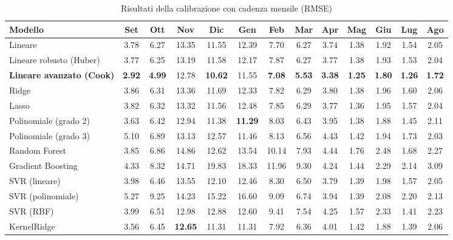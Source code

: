 \begin{table}[H]
    \tiny
    \centering
    \setlength{\tabcolsep}{4pt}
    \def\arraystretch{1.5}
    \begin{tabular}{|l|c|c|c|c|c|c|c|c|c|c|c|c|}
    \hline
        \textbf{Modello} & \textbf{Set} & \textbf{Ott} & \textbf{Nov} & \textbf{Dic} & \textbf{Gen} & \textbf{Feb} & \textbf{Mar} & \textbf{Apr} & \textbf{Mag} & \textbf{Giu} & \textbf{Lug} & \textbf{Ago} \\ \hline
        Lineare & 3.78 & 6.27 & 13.35 & 11.55 & 12.39 & 7.70 & 6.27 & 3.74 & 1.38 & 1.92 & 1.54 & 2.05 \\ \hline
        Lineare robusto (Huber) & 3.77 & 6.25 & 13.19 & 11.58 & 12.17 & 7.87 & 6.27 & 3.77 & 1.38 & 1.93 & 1.53 & 2.04 \\ \hline
        \textbf{Lineare avanzato (Cook)} & \textbf{2.92} & \textbf{4.99} & 12.78 & \textbf{10.62} & 11.55 & \textbf{7.08} & \textbf{5.53} & \textbf{3.38} & \textbf{1.25} & \textbf{1.80} & \textbf{1.26} & \textbf{1.72} \\ \hline
        Ridge & 3.86 & 6.31 & 13.36 & 11.69 & 12.33 & 7.82 & 6.29 & 3.80 & 1.38 & 1.96 & 1.60 & 2.06 \\ \hline
        Lasso & 3.82 & 6.32 & 13.32 & 11.56 & 12.48 & 7.85 & 6.29 & 3.77 & 1.36 & 1.95 & 1.57 & 2.04 \\ \hline
        Polinomiale (grado 2) & 3.63 & 6.42 & 12.94 & 11.38 & \textbf{11.29} & 8.03 & 6.43 & 3.95 & 1.38 & 1.88 & 1.45 & 2.11 \\ \hline
        Polinomiale (grado 3) & 5.10 & 6.89 & 13.13 & 12.57 & 11.46 & 8.13 & 6.56 & 4.43 & 1.42 & 1.94 & 1.73 & 2.03 \\ \hline
        Random Forest & 3.85 & 6.86 & 14.86 & 12.62 & 13.54 & 10.14 & 7.93 & 4.44 & 1.76 & 2.48 & 1.68 & 2.27 \\ \hline
        Gradient Boosting & 4.33 & 8.32 & 14.71 & 19.83 & 18.33 & 11.96 & 9.30 & 4.24 & 1.44 & 2.29 & 2.14 & 3.09 \\ \hline
        SVR (lineare) & 3.98 & 6.46 & 13.55 & 12.10 & 12.46 & 8.30 & 6.50 & 3.79 & 1.39 & 1.98 & 1.57 & 2.05 \\ \hline
        SVR (polinomiale) & 5.27 & 9.25 & 14.23 & 15.22 & 16.60 & 9.09 & 6.74 & 3.94 & 1.39 & 2.08 & 2.20 & 2.13 \\ \hline
        SVR (RBF) & 3.99 & 6.51 & 12.98 & 12.88 & 12.60 & 9.41 & 7.54 & 4.25 & 1.57 & 2.33 & 1.41 & 2.23 \\ \hline
        KernelRidge & 3.56 & 6.45 & \textbf{12.65} & 11.31 & 11.31 & 7.92 & 6.36 & 4.01 & 1.42 & 1.88 & 1.39 & 2.06 \\ \hline
    \end{tabular}
    \captionsetup{justification=centering}
    \caption{Risultati della calibrazione  con cadenza mensile (RMSE)}
    \label{fig:risultati-pm2.5-rmse-mese}
\end{table}

